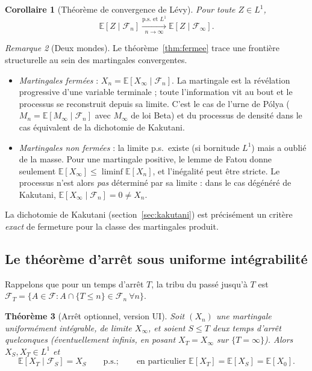 \documentclass[11pt,a4paper]{article}
\theoremstyle{plain}
\newtheorem{theorem}{Théorème}[section]
\newtheorem{corollary}[theorem]{Corollaire}
\theoremstyle{definition}
\theoremstyle{remark}
\newtheorem{remark}[theorem]{Remarque}
\newcommand{\E}{\mathbb{E}}
\newcommand{\F}{\mathcal{F}}
\newcommand{\ps}{\text{p.s.}}
\begin{document}
\begin{corollary}[Théorème de convergence de Lévy]\label{cor:levy}
Pour toute $Z \in L^1$,
\[
\E[Z \mid \F_n] \xrightarrow[n\to\infty]{\ps \text{ et } L^1}
\E[Z \mid \F_\infty].
\]
\end{corollary}

\begin{remark}[Deux mondes]\label{rem:deux-mondes}
Le théorème~\ref{thm:fermee} trace une frontière structurelle au sein des
martingales convergentes.
\begin{itemize}
\item \emph{Martingales fermées} : $X_n = \E[X_\infty \mid \F_n]$. La
martingale est la révélation progressive d'une variable terminale ; toute
l'information vit \og au bout \fg{} et le processus se reconstruit depuis sa
limite. C'est le cas de l'urne de Pólya ($M_n = \E[M_\infty \mid \F_n]$ avec
$M_\infty$ de loi Beta) et du processus de densité dans le cas équivalent de la
dichotomie de Kakutani.
\item \emph{Martingales non fermées} : la limite p.s.\ existe (si bornitude
$L^1$) mais a \og oublié \fg{} de la masse. Pour une martingale positive, le
lemme de Fatou donne seulement $\E[X_\infty] \le \liminf \E[X_n]$, et
l'inégalité peut être stricte. Le processus n'est alors \emph{pas} déterminé
par sa limite : dans le cas dégénéré de Kakutani, $\E[X_\infty \mid \F_n] = 0
\ne X_n$.
\end{itemize}
La dichotomie de Kakutani (section~\ref{sec:kakutani}) est précisément un
critère \emph{exact} de fermeture pour la classe des martingales produit.
\end{remark}

\subsection{Le théorème d'arrêt sous uniforme intégrabilité}

Rappelons que pour un temps d'arrêt $T$, la tribu du passé jusqu'à $T$ est
$\F_T = \{A \in \F : A \cap \{T \le n\} \in \F_n \ \forall n\}$.

\begin{theorem}[Arrêt optionnel, version UI]\label{thm:arret}
Soit $(X_n)$ une martingale uniformément intégrable, de limite $X_\infty$, et
soient $S \le T$ deux temps d'arrêt quelconques (éventuellement infinis, en
posant $X_T = X_\infty$ sur $\{T = \infty\}$). Alors $X_S, X_T \in L^1$ et
\[
\E[X_T \mid \F_S] = X_S \qquad \ps ;
\qquad \text{en particulier } \E[X_T] = \E[X_S] = \E[X_0].
\]
\end{theorem}
\end{document}
